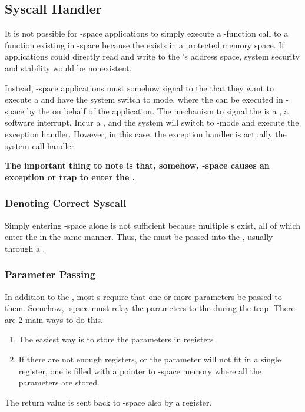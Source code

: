 \subsection{Syscall Handler}\label{subsec:Syscall_Handler}
It is not possible for -space applications to simply execute a -function call to a function existing in -space because the  exists in a protected memory space.
If applications could directly read and write to the ’s address space, system security and stability would be nonexistent.

Instead, -space applications must somehow signal to the  that they want to execute a  and have the system switch to  mode, where the  can be executed in -space by the  on behalf of the application.
The mechanism to signal the  is a , a software interrupt.
Incur a , and the system will switch to -mode and execute the exception handler.
However, in this case, the exception handler is actually the system call handler

\begin{center}
\large{\textbf{The important thing to note is that, somehow, -space causes an exception or trap to enter the .}}
\end{center}

\subsubsection{Denoting Correct Syscall}\label{subsubsec:Denote_Correct_Syscall}
Simply entering -space alone is not sufficient because multiple s exist, all of which enter the  in the same manner.
Thus, the  must be passed into the , usually through a .

\subsubsection{Parameter Passing}\label{subsubsec:Parameter_Passing}
In addition to the , most s require that one or more parameters be passed to them.
Somehow, -space must relay the parameters to the  during the trap.
There are 2 main ways to do this.
\begin{enumerate}[noitemsep]
\item The easiest way is to store the parameters in registers
\item If there are not enough registers, or the parameter will not fit in a single register, one is filled with a  pointer to -space memory where all the parameters are stored.
\end{enumerate}

The return value is sent back to -space also by a register.

